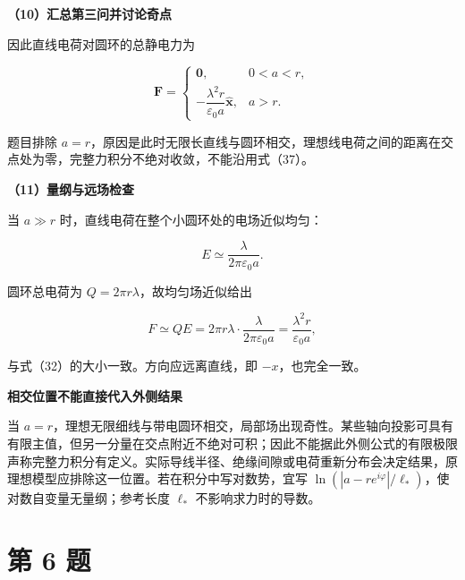\documentclass[12pt,a4paper,UTF8]{ctexart}
\begin{document}
\textbf{（10）汇总第三问并讨论奇点}

因此直线电荷对圆环的总静电力为

\[
\boxed{
\boldsymbol F=
\begin{cases}
\boldsymbol 0, & 0<a<r,\\[4pt]
-\dfrac{\lambda^2r}{\varepsilon_0a}\hat{\boldsymbol x}, & a>r.
\end{cases}
}
\tag{37}
\]

题目排除
\(a=r\)，原因是此时无限长直线与圆环相交，理想线电荷之间的距离在交点处为零，完整力积分不绝对收敛，不能沿用式（37）。

\textbf{（11）量纲与远场检查}

当 \(a\gg r\) 时，直线电荷在整个小圆环处的电场近似均匀：

\[
E\simeq\frac{\lambda}{2\pi\varepsilon_0a}.
\]

圆环总电荷为 \(Q=2\pi r\lambda\)，故均匀场近似给出

\[
F\simeq QE
=2\pi r\lambda\cdot
\frac{\lambda}{2\pi\varepsilon_0a}
=\frac{\lambda^2r}{\varepsilon_0a},
\]

与式（32）的大小一致。方向应远离直线，即 \(-x\)，也完全一致。

\textbf{相交位置不能直接代入外侧结果}

当
\(a=r\)，理想无限细线与带电圆环相交，局部场出现奇性。某些轴向投影可具有有限主值，但另一分量在交点附近不绝对可积；因此不能据此外侧公式的有限极限声称完整力积分有定义。实际导线半径、绝缘间隙或电荷重新分布会决定结果，原理想模型应排除这一位置。若在积分中写对数势，宜写
\(\ln(|a-re^{i\varphi}|/\ell_*)\)，使对数自变量无量纲；参考长度
\(\ell_*\) 不影响求力时的导数。

\newpage

\section{第 6 题}\label{ux7b2c-6-ux9898}
\end{document}
